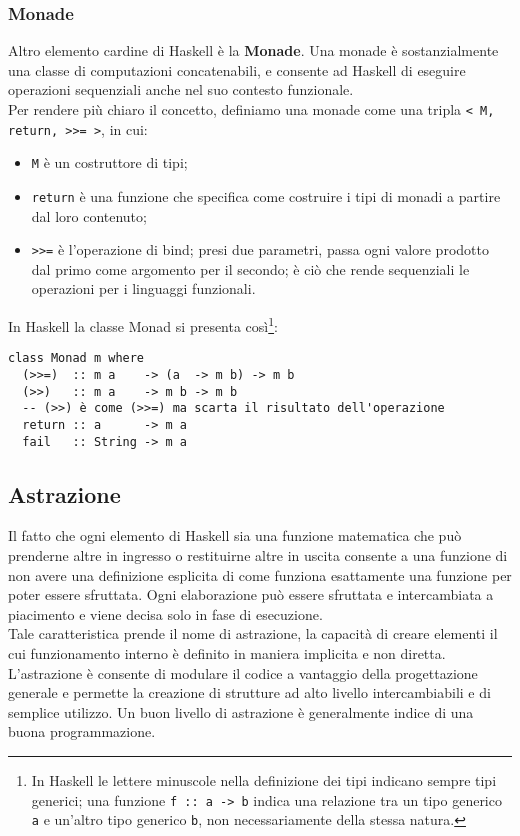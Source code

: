 \subsubsection{Monade}
Altro elemento cardine di Haskell è la \textbf{Monade}. Una monade è sostanzialmente una classe di computazioni concatenabili, e consente ad Haskell di eseguire operazioni sequenziali anche nel suo contesto funzionale.\\
Per rendere più chiaro il concetto, definiamo una monade come una tripla \texttt{< M, return, >{}>= >}, in cui:
\begin{itemize}
\item{\texttt{M} è un costruttore di tipi;}
\item{\texttt{return} è una funzione che specifica come costruire i tipi di monadi a partire dal loro contenuto;}
\item{\texttt{>{}>=} è l'operazione di bind; presi due parametri, passa ogni valore prodotto dal primo come argomento per il secondo; è ciò che rende sequenziali le operazioni per i linguaggi funzionali.}
\end{itemize}
In Haskell la classe Monad si presenta così\footnote{In Haskell le lettere minuscole nella definizione dei tipi indicano sempre tipi generici; una funzione \texttt{f :: a -> b} indica una relazione tra un tipo generico \texttt{a} e un'altro tipo generico \texttt{b}, non necessariamente della stessa natura.}:
\begin{verbatim}
class Monad m where
  (>>=)  :: m a    -> (a  -> m b) -> m b
  (>>)   :: m a    -> m b -> m b            
  -- (>>) è come (>>=) ma scarta il risultato dell'operazione
  return :: a      -> m a
  fail   :: String -> m a
\end{verbatim}
\subsection{Astrazione}
Il fatto che ogni elemento di Haskell sia una funzione matematica che può prenderne altre in ingresso o restituirne altre in uscita consente a una funzione di non avere una definizione esplicita di come funziona esattamente una funzione per poter essere sfruttata. Ogni elaborazione può essere sfruttata e intercambiata a piacimento e viene decisa solo in fase di esecuzione.\\
Tale caratteristica prende il nome di astrazione, la capacità di creare elementi il cui funzionamento interno è definito in maniera implicita e non diretta.\\
L'astrazione è consente di modulare il codice a vantaggio della progettazione generale e permette la creazione di strutture ad alto livello intercambiabili e di semplice utilizzo. Un buon livello di astrazione è generalmente indice di una buona programmazione.

